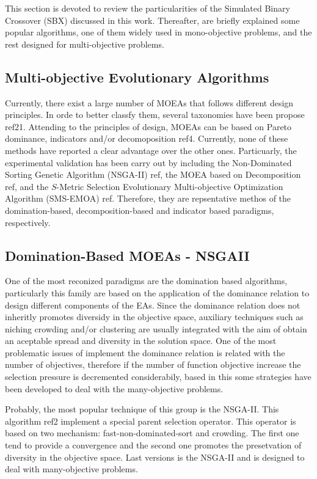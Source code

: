 This section is devoted to review the particularities of the Simulated Binary Crossover (SBX) discussed in this work.
%
Thereafter, are briefly explained some popular algorithms, one of them widely used in mono-objective problems, and the rest designed for multi-objective problems.

\subsection{Multi-objective Evolutionary Algorithms}
Currently, there exist a large number of MOEAs that follows different design principles.
%
In orde to better classfy them, several taxonomies have been propose ref21.
%
Attending to the principles of design, MOEAs can be based on Pareto dominance, indicators and/or decomoposition ref4.
%
Currently, none of these methods have reported a clear advantage over the other ones.
%
Particuarly, the experimental validation has been carry out by including the Non-Dominated Sorting Genetic Algorithm (NSGA-II) ref, the MOEA based on Decomposition ref, and the $S$-Metric Selection Evolutionary Multi-objective Optimization Algorithm (SMS-EMOA) ref.
%
Therefore, they are repsentative methos of the domination-based, decomposition-based and indicator based paradigms, respectively.

\subsection{Domination-Based MOEAs - NSGAII}

One of the most reconized paradigms are the domination based algorithms, particularly this family are based on the application of the dominance relation to design different components of the EAs.
%
Since the dominance relation does not inheritly promotes diversidy in the objective space, auxiliary techniques such as niching crowding and/or clustering are usually integrated with the aim of obtain an aceptable spread and diversity in the solution space.
%
One of the most problematic issues of implement the dominance relation is related with the number of objectives, therefore if the number of function objective increase the selection pressure is decremented considerabily, based in this some strategies have been developed to deal with the many-objective problems.

%
Probably, the most popular technique of this group is the NSGA-II.
%
This algorithm ref2 implement a special parent selection operator.
%
This operator is based on two mechanism: fast-non-dominated-sort and crowding.
%
The first one tend to provide a convergence and the second one promotes the presetvation of diversity in the objective space.
%
Last versions is the NSGA-II and is designed to deal with many-objective problems.
%

